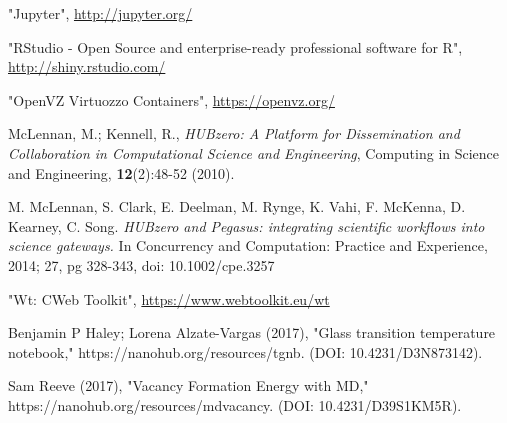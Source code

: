 \documentclass[conference]{../sty/IEEEtran}
\newcommand\CC{C\nolinebreak[4]\hspace{-.05em}\raisebox{.4ex}{\relsize{-3}{\textbf{++}}}\hspace{.25em}}
\begin{document}
\begin{thebibliography}{1}

"Jupyter", \url{http://jupyter.org/}

"RStudio - Open Source and enterprise-ready professional software for R", \url{http://shiny.rstudio.com/}

"OpenVZ Virtuozzo Containers", \url{https://openvz.org/}

McLennan, M.; Kennell, R., \emph{HUBzero: A Platform for Dissemination
and Collaboration in Computational Science and Engineering}, Computing
in Science and Engineering, \textbf{12}(2):48-52 (2010).

M. McLennan, S. Clark, E. Deelman, M. Rynge, K. Vahi, F.
McKenna, D. Kearney, C. Song. \emph{HUBzero and Pegasus:
integrating scientific workflows into science gateways.} In
Concurrency and Computation: Practice and Experience,
2014; 27, pg 328-343, doi: 10.1002/cpe.3257

"Wt: \CC Web Toolkit", \url{https://www.webtoolkit.eu/wt}

Benjamin P Haley; Lorena Alzate-Vargas (2017), "Glass transition temperature notebook," https://nanohub.org/resources/tgnb. (DOI: 10.4231/D3N873142).

Sam Reeve (2017), "Vacancy Formation Energy with MD," https://nanohub.org/resources/mdvacancy. (DOI: 10.4231/D39S1KM5R).

\end{thebibliography}
\end{document}
